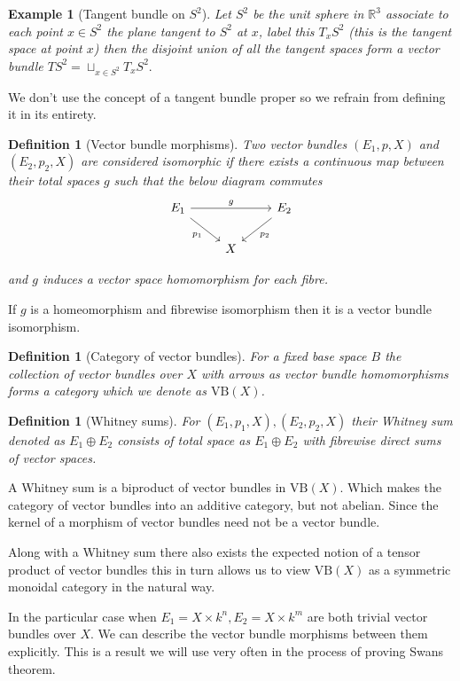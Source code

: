 \documentclass[12pt]{report}
\numberwithin{equation}{section}
\newcommand{\R}{\mathbb{R}}
\newtheorem{definition}[dummy]{Definition}
\newtheorem{example}[dummy]{Example}
\begin{document}
	\begin{example}[Tangent bundle on $S^2$]
		Let $S^2$ be the unit sphere in $\R^3$ associate to each point $x \in S^2$ the plane tangent to $S^2$ at $x$, label this $T_xS^2$ (this is the tangent space at point $x$) then the disjoint union of all the tangent spaces form a vector bundle $T S^2 = \sqcup_{x \in S^2} T_x S^2.$ 
	\end{example}
	We don't use the concept of a tangent bundle proper so we refrain from defining it in its entirety.
	\begin{definition}[Vector bundle morphisms]
		Two vector bundles $(E_1,p, X)$ and $(E_2,p_2, X) $ are considered isomorphic if there exists a continuous map between their total spaces $g$ such that the below diagram commutes
		\[\begin{tikzcd}
			{E_1} && {E_2} \\
			& X
			\arrow["{p_1}"', from=1-1, to=2-2]
			\arrow["{p_2}", from=1-3, to=2-2]
			\arrow["g", from=1-1, to=1-3]
		\end{tikzcd}\]
		
		and $g$ induces a vector space homomorphism for each fibre.
	\end{definition}
	If $g$ is a homeomorphism and fibrewise isomorphism then it is a vector bundle isomorphism.
	
	\begin{definition}[Category of vector bundles]
		For a fixed base space $B$ the collection of vector bundles over $X$ with arrows as vector bundle homomorphisms forms a category which we denote as $\mathrm{VB}(X)$.
	\end{definition}
	\begin{definition}[Whitney sums]
		For $(E_1,p_1, X), (E_2,p_2,X)$ their Whitney sum denoted as $E_1 \oplus E_2$ consists of total space as $E_1 \oplus E_2$ with fibrewise direct sums of vector spaces.
	\end{definition}
	A Whitney sum is a biproduct of vector bundles in $\mathrm{VB}(X)$. Which makes the category of vector bundles into an additive category, but not abelian. Since the kernel of a morphism of vector bundles need not be a vector bundle. 
	
	Along with a Whitney sum there also exists the expected notion of a tensor product of vector bundles this in turn allows us to view $\mathrm{VB}(X)$ as a symmetric monoidal category in the natural way.
	
	In the particular case when $E_1=X \times k^n, E_2=X \times k^m$ are both trivial vector bundles over $X$. We can describe the vector bundle morphisms between them explicitly. This is a result we will use very often in the process of proving Swans theorem. 
	
\end{document}
